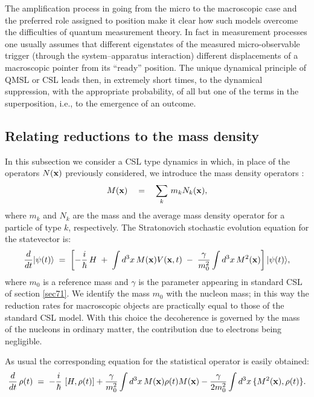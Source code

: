 \documentclass[10pt,a4paper]{article}
\begin{document}
The amplification process in going from the micro to the
macroscopic case and the preferred role assigned to position make
it clear how such models overcome the difficulties of quantum
measurement theory. In fact in measurement processes one usually
assumes that different eigenstates of the measured
micro-observable trigger (through the system--apparatus
interaction) different displacements of a macroscopic pointer from
its ``ready'' position. The unique dynamical principle of QMSL or
CSL leads then, in extremely short times, to the dynamical
suppression, with the appropriate probability, of all but one of
the terms in the superposition, i.e., to the emergence of an
outcome.


\subsection{Relating reductions to the mass density} \label{sec76}

In this subsection we consider a CSL type dynamics in which, in
place of the operators $N({\bf x})$ previously considered,  we
introduce the mass density operators \cite{cc}:
\begin{equation}
M({\bf x}) \quad = \quad \sum_{k}\, m_{k} N_{k}({\bf x}),
\end{equation}
where $m_{k}$  and $N_{k}$ are the mass and the average mass
density operator for a particle of type $k$, respectively. The
Stratonovich stochastic evolution equation for the statevector is:
\begin{equation}
\frac{d}{dt} |\psi(t)\rangle \; = \; \left[ - \frac{i}{\hbar}\, H
\; + \; \int d^{3} x\, M({\bf x}) V({\bf x}, t) \; - \;
\frac{\gamma}{m_{0}^{2}} \int d^{3} x\, M^{2}({\bf x}) \right]
|\psi(t)\rangle,
\end{equation}
where $m_{0}$ is a reference mass and $\gamma$ is the parameter
appearing in standard CSL of section \ref{sec71}. We identify the
mass $m_{0}$ with the nucleon mass; in this way the reduction
rates for macroscopic objects are practically equal to those of
the standard CSL model. With this choice the decoherence is
governed by the mass of the nucleons in ordinary matter, the
contribution due to electrons being negligible.

As usual the corresponding equation for the statistical operator
is easily obtained:
\begin{equation} \label{cslsob}
\frac{d}{dt}\, \rho(t) \; = \; - \frac{i}{\hbar}\, \left[ H,
\rho(t) \right]  +  \frac{\gamma}{m^{2}_{0}} \int d^3 x \, M({\bf
x}) \rho(t) M({\bf x})  - \frac{\gamma}{2m^{2}_{0}}  \int d^3 x \,
\{ M^{2}({\bf x}) , \rho(t) \}.
\end{equation}
\end{document}
